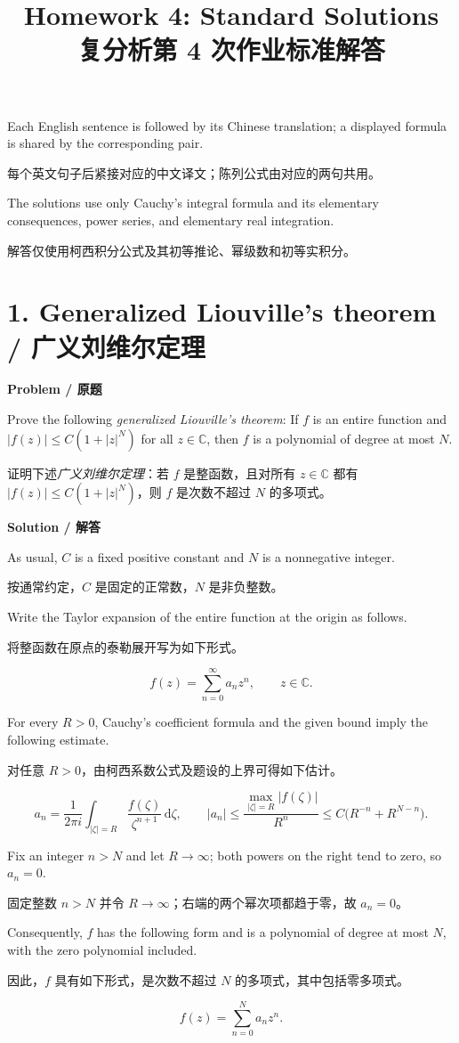 \documentclass[11pt,a4paper]{ctexart}
\title{Homework 4: Standard Solutions\\复分析第 4 次作业标准解答}
\author{}\date{}
\newcommand{\C}{\mathbb C}
\newcommand{\pair}[2]{\par\noindent #1\par\nopagebreak[3]\noindent #2\par}
\newcommand{\heading}[2]{\par\medskip\textbf{#1 / #2}\par\nopagebreak[4]}
\newcommand{\dd}{\,\mathrm d}
\begin{document}
\maketitle
\vspace{-2em}
\pair{Each English sentence is followed by its Chinese translation; a displayed formula is shared by the corresponding pair.}{每个英文句子后紧接对应的中文译文；陈列公式由对应的两句共用。}
\pair{The solutions use only Cauchy's integral formula and its elementary consequences, power series, and elementary real integration.}{解答仅使用柯西积分公式及其初等推论、幂级数和初等实积分。}

\section*{1. Generalized Liouville's theorem / 广义刘维尔定理}
\heading{Problem}{原题}
\pair{Prove the following \emph{generalized Liouville's theorem}: If $f$ is an entire function and $|f(z)|\le C(1+|z|^N)$ for all $z\in\C$, then $f$ is a polynomial of degree at most $N$.}{证明下述\emph{广义刘维尔定理}：若 $f$ 是整函数，且对所有 $z\in\C$ 都有 $|f(z)|\le C(1+|z|^N)$，则 $f$ 是次数不超过 $N$ 的多项式。}

\heading{Solution}{解答}
\pair{As usual, $C$ is a fixed positive constant and $N$ is a nonnegative integer.}{按通常约定，$C$ 是固定的正常数，$N$ 是非负整数。}
\pair{Write the Taylor expansion of the entire function at the origin as follows.}{将整函数在原点的泰勒展开写为如下形式。}
\[
f(z)=\sum_{n=0}^{\infty}a_nz^n,\qquad z\in\C.
\]
\pair{For every $R>0$, Cauchy's coefficient formula and the given bound imply the following estimate.}{对任意 $R>0$，由柯西系数公式及题设的上界可得如下估计。}
\[
a_n=\frac{1}{2\pi i}\int_{|\zeta|=R}
       \frac{f(\zeta)}{\zeta^{n+1}}\dd\zeta,
\qquad
|a_n|\le\frac{\max_{|\zeta|=R}|f(\zeta)|}{R^n}
\le C\bigl(R^{-n}+R^{N-n}\bigr).
\]
\pair{Fix an integer $n>N$ and let $R\to\infty$; both powers on the right tend to zero, so $a_n=0$.}{固定整数 $n>N$ 并令 $R\to\infty$；右端的两个幂次项都趋于零，故 $a_n=0$。}
\pair{Consequently, $f$ has the following form and is a polynomial of degree at most $N$, with the zero polynomial included.}{因此，$f$ 具有如下形式，是次数不超过 $N$ 的多项式，其中包括零多项式。}
\[
\boxed{f(z)=\sum_{n=0}^{N}a_nz^n.}
\]

\newpage
\end{document}
